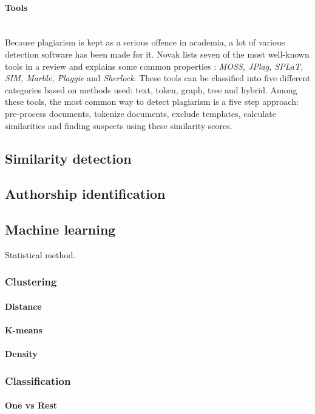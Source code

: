 \paragraph{Tools}\mbox{}\\
Because plagiarism is kept as a serious offence in academia, a lot of various detection software has been made for it. Novak lists seven of the most well-known tools in a review and explains some common properties \cite{RSCAD2016}: \emph{MOSS, JPlag, SPLaT, SIM, Marble, Plaggie} and \emph{Sherlock}. These tools can be classified into five different categories based on methods used: text, token, graph, tree and hybrid. Among these tools, the most common way to detect plagiarism is a five step approach: pre-process documents, tokenize documents, exclude templates, calculate similarities and finding suspects using these similarity scores.

\newpage

\subsection{Similarity detection}

\subsection{Authorship identification}

\subsection{Machine learning}

Statistical method.

\subsubsection{Clustering}

\paragraph{Distance}

\paragraph{K-means}

\paragraph{Density}

\subsubsection{Classification}

\paragraph{One vs Rest}